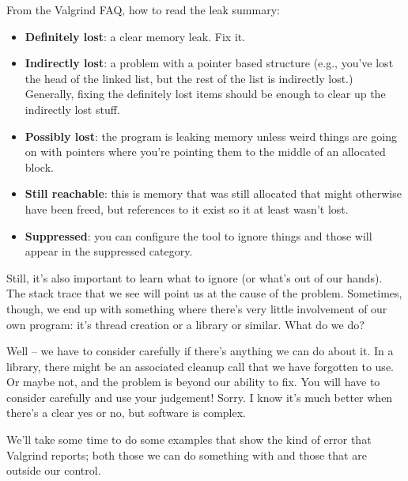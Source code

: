 From the Valgrind FAQ, how to read the leak summary:
\begin{itemize}
	\item \textbf{Definitely lost}: a clear memory leak. Fix it.
	\item \textbf{Indirectly lost}: a problem with a pointer based structure (e.g., you've lost the head of the linked list, but the rest of the list is indirectly lost.) Generally, fixing the definitely lost items should be enough to clear up the indirectly lost stuff.
	\item \textbf{Possibly lost}: the program is leaking memory unless weird things are going on with pointers where you're pointing them to the middle of an allocated block.
	\item \textbf{Still reachable}: this is memory that was still allocated that might otherwise have been freed, but references to it exist so it at least wasn't lost.
	\item \textbf{Suppressed}: you can configure the tool to ignore things and those will appear in the suppressed category.
\end{itemize}

Still, it's also important to learn what to ignore (or what's out of our hands). The stack trace that we see will point us at the cause of the problem. Sometimes, though, we end up with something where there's very little involvement of our own program: it's thread creation or a library or similar. What do we do?

Well -- we have to consider carefully if there's anything we can do about it. In a library, there might be an associated cleanup call that we have forgotten to use. Or maybe not, and the problem is beyond our ability to fix. You will have to consider carefully and use your judgement! Sorry. I know it's much better when there's a clear yes or no, but software is complex.

We'll take some time to do some examples that show the kind of error that Valgrind reports; both those we can do something with and those that are outside our control.

